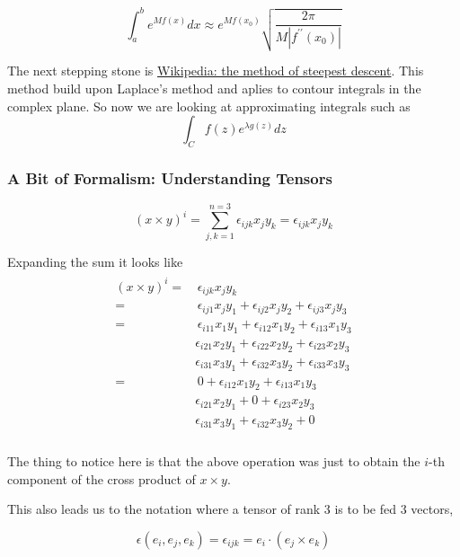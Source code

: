 $$
\int_{a}^{b} e^{Mf(x)} dx \approx
    e^{Mf(x_0)} \sqrt{ \frac{2\pi}{M |f^{\prime\prime} (x_0)|} }
$$

The next stepping stone is
\href{https://en.wikipedia.org/wiki/Method_of_steepest_descent}{Wikipedia: the method of steepest descent}.
This method build upon Laplace's method and aplies to contour integrals in the complex plane.
So now we are looking at approximating integrals such as
$$
\int_{C} f(z) e^{\lambda g(z)} dz
$$


\subsubsection{A Bit of Formalism: Understanding Tensors}

$$
\left( x \times y \right)^i = \sum_{j,k=1}^{n=3} \epsilon_{ijk} x_j y_k = \epsilon_{ijk} x_j y_k
$$

Expanding the sum it looks like
\begin{align}
    \begin{split}
\left( x \times y \right)^i =& \, \epsilon_{ijk} x_j y_k \\
=& \, \epsilon_{ij1} x_j y_1 + \epsilon_{ij2} x_j y_2 + \epsilon_{ij3} x_j y_3 \\
=& \, \epsilon_{i11} x_1 y_1 + \epsilon_{i12} x_1 y_2 + \epsilon_{i13} x_1 y_3 \\
    & \epsilon_{i21} x_2 y_1 + \epsilon_{i22} x_2 y_2 + \epsilon_{i23} x_2 y_3 \\
    & \epsilon_{i31} x_3 y_1 + \epsilon_{i32} x_3 y_2 + \epsilon_{i33} x_3 y_3 \\
=& \, 0 + \epsilon_{i12} x_1 y_2 + \epsilon_{i13} x_1 y_3 \\
    & \epsilon_{i21} x_2 y_1 + 0 + \epsilon_{i23} x_2 y_3 \\
    & \epsilon_{i31} x_3 y_1 + \epsilon_{i32} x_3 y_2 + 0 \\
    \end{split}
\end{align} \label{tensors:levi-civita-component-i}

The thing to notice here is that the above operation was just to obtain the $i$-th component of the cross product
of $x \times y$.

This also leads us to the notation where a tensor of rank 3 is to be fed 3 vectors,

$$
\epsilon (e_i, e_j, e_k) = \epsilon_{ijk} = e_i \cdot (e_j \times e_k)
$$

